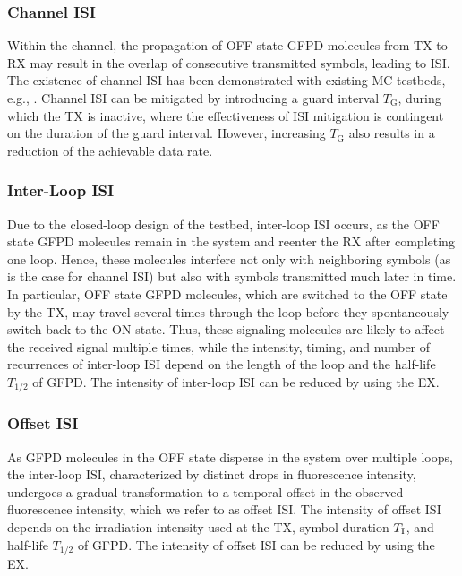 \subsubsection{Channel ISI}\label{subsubsec:channel_isi}
\scaleSubsubsectionBelow
Within the channel, the propagation of OFF state \ac{GFPD} molecules from \ac{TX} to \ac{RX} may result in the overlap of consecutive transmitted symbols, leading to \ac{ISI}.
The existence of channel \ac{ISI} has been demonstrated with existing \ac{MC} testbeds, e.g., \cite{grebenstein2018biological, wang2020understanding}.
Channel \ac{ISI} can be mitigated by introducing a guard interval $T_\mathrm{G}$, during which the \ac{TX} is inactive, where the effectiveness of \ac{ISI} mitigation is contingent on the duration of the guard interval. However, increasing $T_\mathrm{G}$ also results in a reduction of the achievable data rate.
\scaleSubsubsection
\subsubsection{Inter-Loop ISI}\label{subsubsec:loop_isi}
\scaleSubsubsectionBelow
Due to the closed-loop design of the testbed, inter-loop \ac{ISI} occurs, as the OFF state \ac{GFPD} molecules remain in the system and reenter the \ac{RX} after completing one loop. Hence, these molecules interfere not only with neighboring symbols (as is the case for channel \ac{ISI}) but also with symbols transmitted much later in time. In particular, OFF state \ac{GFPD} molecules, which are switched
to the OFF state by the \ac{TX}, may travel several times through the loop before they spontaneously switch back to the ON state. Thus, these signaling molecules are likely to affect the received signal multiple times, while the intensity, timing, and number of recurrences of inter-loop \ac{ISI} depend on the length of the loop and the half-life $T_{1/2}$ of \ac{GFPD}. The intensity of inter-loop \ac{ISI} can be reduced by using the \ac{EX}.
%
\scaleSubsubsection
\subsubsection{Offset ISI}\label{subsubsec:offset_isi}
\scaleSubsubsectionBelow
As \ac{GFPD} molecules in the OFF state disperse in the system over multiple loops, the inter-loop \ac{ISI}, characterized by distinct drops in fluorescence intensity, undergoes a gradual transformation to a temporal offset in the observed fluorescence intensity, which we refer to as offset \ac{ISI}. The intensity of offset \ac{ISI} depends on the irradiation intensity used at the \ac{TX}, symbol duration $T_{\mathrm{I}}$, and half-life $T_{1/2}$ of \ac{GFPD}. The intensity of offset \ac{ISI} can be reduced by using the \ac{EX}.
%
\scaleSubsubsection
